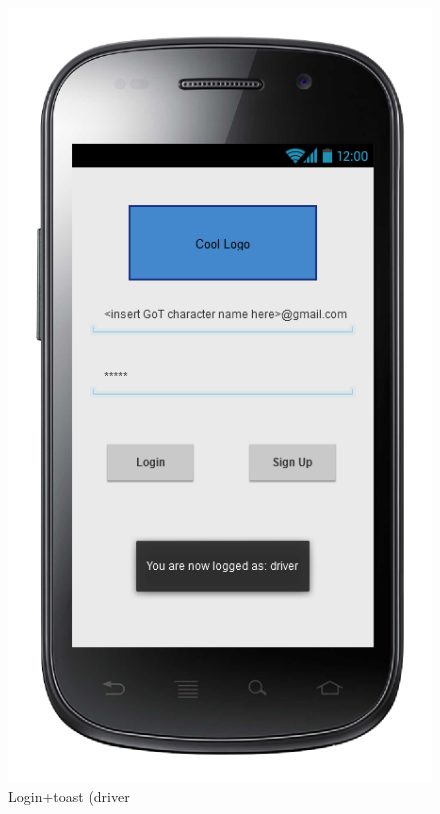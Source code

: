\begin{figure} [h]
\centering
  	  \includegraphics[scale=0.5]{ui/Login + toast (driver).png}
\caption{Login+toast (driver}
  
	\end{figure}
